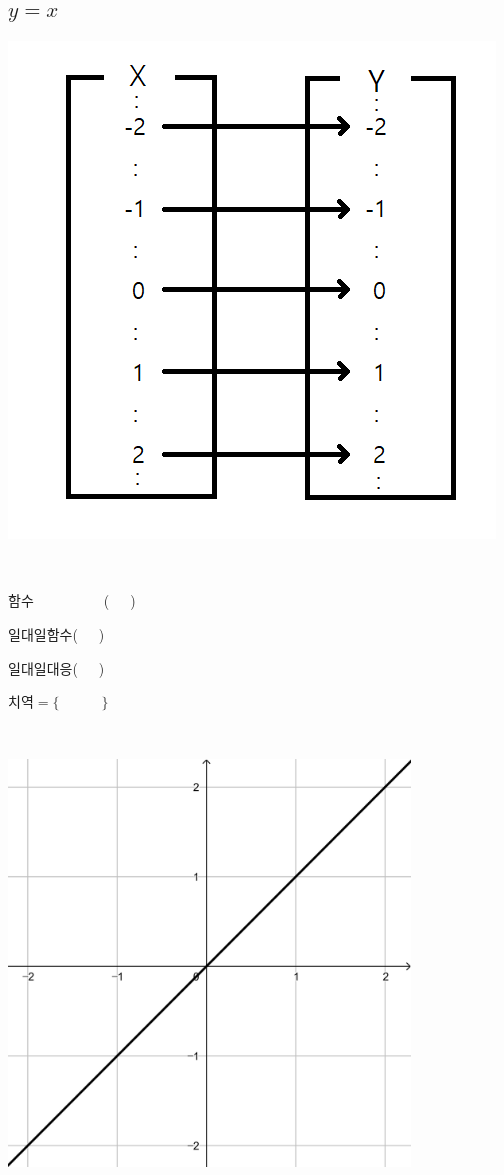 \documentclass[a4paper]{oblivoir}
\begin{document}
\subsection{\(y=x\)}
%
\begin{minipage}{0.4\textwidth}
\includegraphics[width=\textwidth]{y=x}
\end{minipage}
~
\begin{minipage}{0.20\textwidth}
함수~~~~~~~~~~(~~~)\par\bigskip
일대일함수(~~~)\par\bigskip
일대일대응(~~~)\par\bigskip
치역\(=\{\qquad\quad\}\)
\end{minipage}
~
\begin{minipage}{0.35\textwidth}
\includegraphics[width=0.8\textwidth]{y=x-}
\end{minipage}
\end{document}
